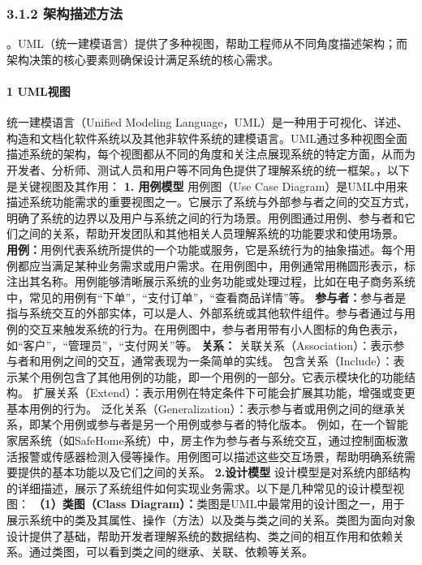 \subsubsection{3.1.2 架构描述方法}\label{ux67b6ux6784ux63cfux8ff0ux65b9ux6cd5}
。UML（统一建模语言）提供了多种视图，帮助工程师从不同角度描述架构；而架构决策的核心要素则确保设计满足系统的核心需求。 \paragraph{1 UML视图}\label{umlux89c6ux56fe} 统一建模语言（Unified
Modeling
Language，UML）是一种用于可视化、详述、构造和文档化软件系统以及其他非软件系统的建模语言。UML通过多种视图全面描述系统的架构，每个视图都从不同的角度和关注点展现系统的特定方面，从而为开发者、分析师、测试人员和用户等不同角色提供了理解系统的统一框架。，以下是关键视图及其作用：
\textbf{1. 用例模型} 用例图（Use Case
Diagram）是UML中用来描述系统功能需求的重要视图之一。它展示了系统与外部参与者之间的交互方式，明确了系统的边界以及用户与系统之间的行为场景。用例图通过用例、参与者和它们之间的关系，帮助开发团队和其他相关人员理解系统的功能要求和使用场景。
\textbf{用例：}用例代表系统所提供的一个功能或服务，它是系统行为的抽象描述。每个用例都应当满足某种业务需求或用户需求。在用例图中，用例通常用椭圆形表示，标注出其名称。用例能够清晰展示系统的业务功能或处理过程，比如在电子商务系统中，常见的用例有``下单''，``支付订单''，``查看商品详情''等。
\textbf{参与者：}参与者是指与系统交互的外部实体，可以是人、外部系统或其他软件组件。参与者通过与用例的交互来触发系统的行为。在用例图中，参与者用带有小人图标的角色表示，如``客户''，``管理员''，``支付网关''等。
\textbf{关系：} 关联关系（Association）：表示参与者和用例之间的交互，通常表现为一条简单的实线。 包含关系（Include）：表示某个用例包含了其他用例的功能，即一个用例的一部分。它表示模块化的功能结构。
扩展关系（Extend）：表示用例在特定条件下可能会扩展其功能，增强或变更基本用例的行为。 泛化关系（Generalization）：表示参与者或用例之间的继承关系，即某个用例或参与者是另一个用例或参与者的特化版本。
例如，在一个智能家居系统（如SafeHome系统）中，房主作为参与者与系统交互，通过控制面板激活报警或传感器检测入侵等操作。用例图可以描述这些交互场景，帮助明确系统需要提供的基本功能以及它们之间的关系。 \textbf{2.设计模型}
设计模型是对系统内部结构的详细描述，展示了系统组件如何实现业务需求。以下是几种常见的设计模型视图： \textbf{（1）类图（Class
Diagram）：}类图是UML中最常用的设计图之一，用于展示系统中的类及其属性、操作（方法）以及类与类之间的关系。类图为面向对象设计提供了基础，帮助开发者理解系统的数据结构、类之间的相互作用和依赖关系。通过类图，可以看到类之间的继承、关联、依赖等关系。
